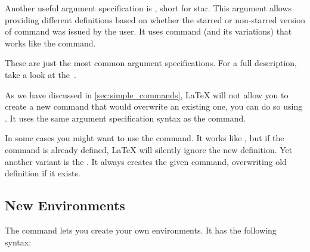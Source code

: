 
Another useful argument specification is , short for star. This
argument allows providing different definitions based on whether the
starred or non-starred version of command was issued by the user. It uses
 command (and its variations)
that works like the  command.

\begin{chktexignore}
\end{chktexignore}

These are just the most common argument specifications. For a full description,
take a look at the~\cite{usrguide3}.

As we have discussed in \autoref{sec:simple_commands}, \LaTeX{} will not allow
you to create a new command that would overwrite an existing one, you can do so
using . It uses the same argument specification
syntax as the  command.

In some cases you might want to use the  command.
It works like , but if the command is already defined,
\LaTeX{} will silently ignore the new definition. Yet another variant is the
. It always creates the given command, overwriting
old definition if it exists.

\subsection{New Environments}
The  command lets you create your own environments. It has the
following syntax:

